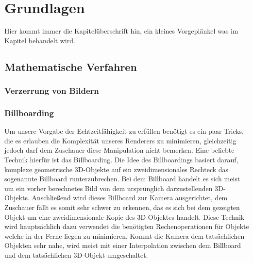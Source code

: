 \chapter{Grundlagen}
\begin{Spacing}{\mylinespace}

Hier kommt immer die Kapitelüberschrift hin, ein kleines Vorgeplänkel was im Kapitel behandelt wird.

\section{Mathematische Verfahren}

\subsection{Verzerrung von Bildern}

\subsection{Billboarding}

Um unsere Vorgabe der Echtzeitfähigkeit zu erfüllen benötigt es ein paar Tricks, die es erlauben die Komplexität unseres Renderers zu minimieren, gleichzeitig jedoch darf dem Zuschauer diese Manipulation nicht bemerken.
Eine beliebte Technik hierfür ist das Billboarding. Die Idee des Billboardings basiert darauf, komplexe geometrische 3D-Objekte auf ein zweidimensionales Rechteck das sogenannte Billboard runterzubrechen. 
Bei dem Billboard handelt es sich meist um ein vorher berechnetes Bild von dem ursprünglich darzustellenden 3D-Objekts.
Anschließend wird dieses Billboard zur Kamera ausgerichtet, dem Zuschauer fällt es somit sehr schwer zu erkennen, das es sich bei dem gezeigten Objekt um eine zweidimensionale Kopie des 3D-Objektes handelt.
Diese Technik wird hauptsächlich dazu verwendet die benötigten Rechenoperationen für Objekte welche in der Ferne liegen zu minimieren. 
Kommt die Kamera dem tatsächlichen Objekten sehr nahe, wird meist mit einer Interpolation zwischen dem Billboard und dem tatsächlichen 3D-Objekt umgeschaltet.
\end{Spacing}
\newpage
\clearpage
